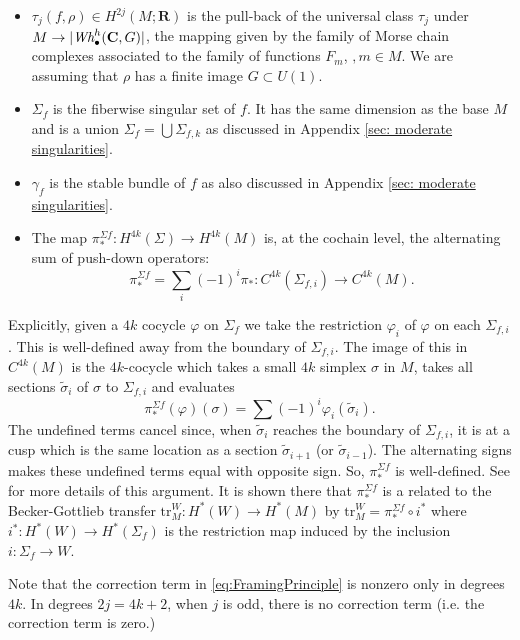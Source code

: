 \documentclass{amsart}
\def\bC{\mathbf{C}}
\def\bR{\mathbf{R}}
\theoremstyle{definition}
\theoremstyle{remark}
\newtheorem{inductive lemma}[theorem]{Inductive Lemma}
\begin{document}
\begin{itemize}
\item  $\tau_j(f,\rho)\in H^{2j}(M;\bR)$ is the pull-back of the universal class $\tau_j$ under $M \to |\text{\em Wh}_\bullet^h(\bC,G)|$, the mapping  given by the family of Morse chain complexes associated to the family of functions $F_m$, $,m\in M$. %
We are assuming that $\rho$ has a finite image $G\subset U(1)$.
\item $\Sigma_f$ is the fiberwise singular set of $f$. It has the same dimension as the base $M$ and is a union $\Sigma_f=\bigcup \Sigma_{f,k}$ as discussed in Appendix \ref{sec: moderate singularities}. 
\item $\gamma_f$ is  the stable bundle of $f$ as also discussed in Appendix \ref{sec: moderate singularities}.
\item The map $\pi_\ast^{\Sigma f}:H^{4k}(\Sigma)\to H^{4k}(M)$ is, at the cochain level, the alternating sum of push-down operators:
\[
	\pi_\ast^{\Sigma f}=\sum_i (-1)^i \pi_\ast:%
	 C^{4k}(\Sigma_{f,i})\to C^{4k}(M).
\]
\end{itemize}


Explicitly, given a $4k$ cocycle $\varphi$ on $\Sigma_f$ we take the restriction $\varphi_i$ of $\varphi$ on each $\Sigma_{f,i}$. This is well-defined away from the boundary of $\Sigma_{f,i}$. The image of this in $C^{4k}(M)$ is the $4k$-cocycle which takes a small $4k$ simplex $\sigma$ in $M$, takes all sections $\tilde\sigma_i$ of $\sigma$ to $\Sigma_{f,i}$ and evaluates
\[
    \pi_\ast^{\Sigma f}(\varphi)(\sigma)=\sum (-1)^i \varphi_i(\tilde\sigma_i).
\]
The undefined terms cancel since, when $\tilde\sigma_i$ reaches the boundary of $\Sigma_{f,i}$, it is at a cusp which is the same location as a section $\tilde\sigma_{i+1}$ (or $\tilde\sigma_{i-1}$). The alternating signs makes these undefined terms equal with opposite sign. So, $\pi_\ast^{\Sigma f}$ is well-defined. See \cite[Proposition 4.8]{I02} for more details of this argument. It is shown there that $\pi_\ast^{\Sigma f}$ is a related to the Becker-Gottlieb transfer $\text{tr}_M^W:H^\ast(W)\to H^\ast(M)$ by $\text{tr}_M^W=\pi_\ast^{\Sigma f}\circ i^\ast$ where $i^\ast:H^\ast(W)\to H^\ast(\Sigma_f)$ is the restriction map induced by the inclusion $i:\Sigma_f \to W$.

Note that the correction term in \eqref{eq:FramingPrinciple} is nonzero only in degrees $4k$. In degrees $2j=4k+2$, when $j$ is odd, there is no correction term (i.e. the correction term is zero.)
\end{document}
